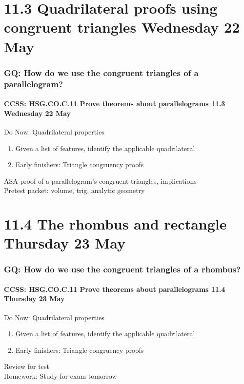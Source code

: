 \documentclass{beamer}
\begin{document}
\section{11.3 Quadrilateral proofs using congruent triangles Wednesday 22 May}
  \frame
  {
    \frametitle{GQ: How do we use the congruent triangles of a parallelogram?}
    \framesubtitle{CCSS: HSG.CO.C.11 Prove theorems about parallelograms \hfill \alert{11.3 Wednesday 22 May}}

    \begin{block}{Do Now: Quadrilateral properties}
      \begin{enumerate}
        \item Given a list of features, identify the applicable quadrilateral
        \item Early finishers: Triangle congruency proofs
      \end{enumerate}
    \end{block}
    ASA proof of a parallelogram's congruent triangles, implications\\
    Pretest packet: volume, trig, analytic geometry
  }

\section{11.4 The rhombus and rectangle Thursday 23 May}
  \frame
  {
    \frametitle{GQ: How do we use the congruent triangles of a rhombus?}
    \framesubtitle{CCSS: HSG.CO.C.11 Prove theorems about parallelograms \hfill \alert{11.4 Thursday 23 May}}

    \begin{block}{Do Now: Quadrilateral properties}
      \begin{enumerate}
        \item Given a list of features, identify the applicable quadrilateral
        \item Early finishers: Triangle congruency proofs
      \end{enumerate}
    \end{block}
    Review for test\\[0.5cm]
    Homework: Study for \alert{exam tomorrow}
  }
\end{document}
